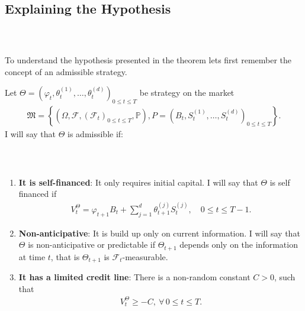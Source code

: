 \documentclass{beamer}
\numberwithin{equation}{section}
\begin{document}
\subsection{Explaining the Hypothesis}

\begin{frame}\frametitle{{\normalsize \secname} \\ {\large \subsecname}}
    To understand the hypothesis presented in the theorem lets first remember the concept of an admissible strategy.
    \begin{definition}
        Let $\Theta = \left(\varphi_t, \theta_t^{(1)}, \ldots, \theta_t^{(d)}\right)_{0 \leq t \leq T}$ be strategy on the market
        \begingroup
        \footnotesize
        \begin{align}
            \mathfrak{M} =
            \left\{
                \left(
                    \Omega, 
                    \mathscr{F}, 
                    \left(
                        \mathscr{F}_t
                    \right)_{0 \leq t \leq T},
                    \mathbb{P}
                \right),
                P =
                \left(
                    B_t,
                    S_t^{(1)},
                    \ldots,
                    S_t^{(d)}
                \right)_{0 \leq t \leq T}
            \right\}.
        \end{align}
        \endgroup
        I will say that $\Theta$ is admissible if:
    \end{definition}
\end{frame}

\begin{frame}\frametitle{{\normalsize \secname} \\ {\large \subsecname}}
    \begin{enumerate}
        \item \textbf{It is self-financed}: It only requires initial capital.
        I will say that $\Theta$ is self financed if
        \begin{align}
            V_t^{\Theta} = \varphi_{t+1}B_t + \sum_{j=1}^d \theta_{t+1}^{(j)}S_t^{(j)}, \quad 0 \leq t \leq T-1. 
        \end{align}
        \item \textbf{Non-anticipative}: It is build up only on current information.
        I will say that $\Theta$ is non-anticipative or predictable if $\Theta_{t+1}$ depends only on the information at time $t$, that is $\Theta_{t+1}$ is $\mathscr{F}_t$-measurable.
        \item \textbf{It has a limited credit line}: There is a non-random constant $C > 0$, such that
        \begin{align}
            V_t^{\Theta} \geq -C, \ \forall \, 0 \leq t \leq T.
        \end{align}
    \end{enumerate}
\end{frame}
\end{document}
